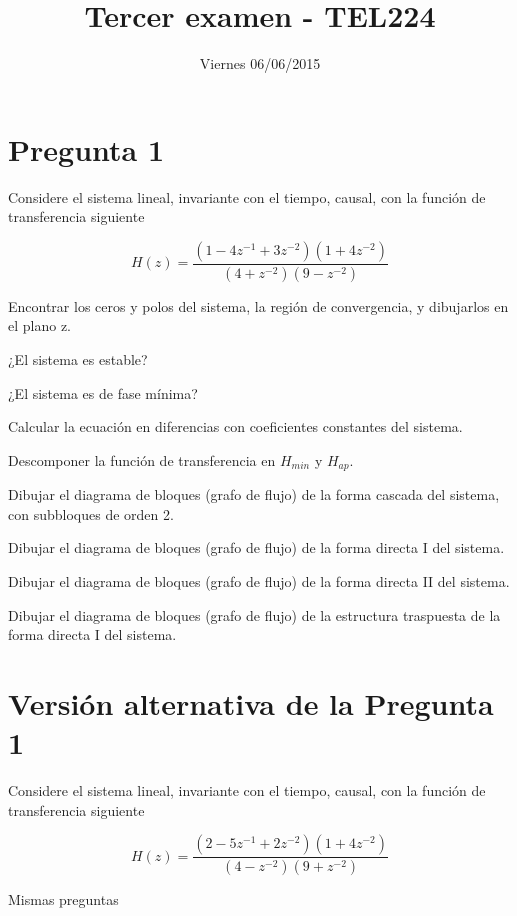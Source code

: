 \documentclass[addpoints]{exam}
\begin{document}
\headrule


\title{Tercer examen - TEL224}
\date{Viernes 06/06/2015}
\maketitle

\vspace{0.1in}

\section*{Pregunta 1}

Considere el sistema lineal, invariante con el tiempo, causal, con la función de transferencia siguiente

$$H(z) = \frac{\left(1 - 4 z^{-1} + 3 z^{-2}\right)\left(1+4z^{-2}\right)}{\left(4+z^{-2}\right)\left(9-z^{-2}\right)}$$

Encontrar los ceros y polos del sistema, la región de convergencia, y dibujarlos en el plano z. 

¿El sistema es estable? 

¿El sistema es de fase mínima?

Calcular la ecuación en diferencias con coeficientes constantes del sistema.

Descomponer la función de transferencia en \(H_{min}\) y \(H_{ap}\).

Dibujar el diagrama de bloques (grafo de flujo) de la forma cascada del sistema, con subbloques de orden 2.

Dibujar el diagrama de bloques (grafo de flujo) de la forma directa I del sistema.

Dibujar el diagrama de bloques (grafo de flujo) de la forma directa II del sistema.

Dibujar el diagrama de bloques (grafo de flujo) de la estructura traspuesta de la forma directa I del sistema.

\section*{Versión alternativa de la Pregunta 1}

Considere el sistema lineal, invariante con el tiempo, causal, con la función de transferencia siguiente

$$H(z) = \frac{\left(2 - 5 z^{-1} + 2 z^{-2}\right)\left(1+4z^{-2}\right)}{\left(4-z^{-2}\right)\left(9+z^{-2}\right)}$$

Mismas preguntas
\footrule
{}
\end{document}
